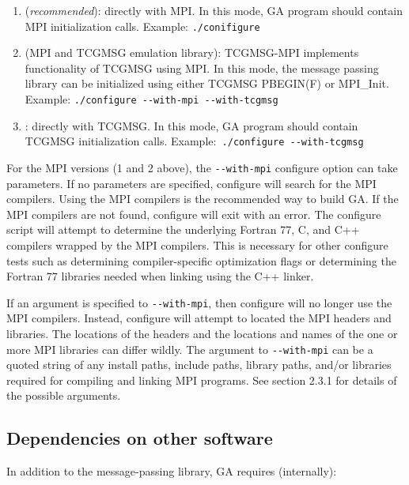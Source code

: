 \begin{enumerate}

\item {} (\emph{recommended}): directly with MPI. In this
mode, GA program should contain MPI initialization calls. Example:
\texttt{./conifigure}

\item {} (MPI and TCGMSG emulation library):
TCGMSG-MPI implements functionality of TCGMSG using MPI.  In this mode, the
message passing library can be initialized using either TCGMSG PBEGIN(F) or
MPI\_Init. Example: \texttt{./configure -{}-with-mpi -{}-with-tcgmsg}

\item {}: directly with TCGMSG.  In this mode, GA
program should contain TCGMSG initialization calls.  Example:\texttt{
./configure -{}-with-tcgmsg}

\end{enumerate}

For the MPI versions (1 and 2 above), the \texttt{-{}-with-mpi} configure
option can take parameters. If no parameters are specified, configure will
search for the MPI compilers. Using the MPI compilers is the recommended way to
build GA. If the MPI compilers are not found, configure will exit with an
error. The configure script will attempt to determine the underlying Fortran
77, C, and C++ compilers wrapped by the MPI compilers. This is necessary for
other configure tests such as determining compiler-specific optimization flags
or determining the Fortran 77 libraries needed when linking using the C++
linker.

If an argument is specified to \texttt{-{}-with-mpi}, then configure will no
longer use the MPI compilers. Instead, configure will attempt to located the
MPI headers and libraries. The locations of the headers and the locations and
names of the one or more MPI libraries can differ wildly. The argument to
\texttt{-{}-with-mpi} can be a quoted string of any install paths, include
paths, library paths, and/or libraries required for compiling and linking MPI
programs. See section 2.3.1 for details of the possible arguments. 

\subsection{Dependencies on other software}

In addition to the message-passing library, GA requires (internally):

